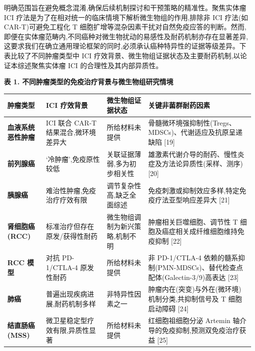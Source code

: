 \documentclass[11pt]{article}
\newcounter{none}
\begin{document}
明确范围旨在避免概念混淆,确保后续机制探讨和干预策略的精准性。聚焦实体瘤 ICI 疗法是为了在相对统一的临床情境下解析微生物组的作用,排除非 ICI 疗法(如 CAR-T)可避免工程化 T 细胞扩增等混杂因素干扰对自然免疫应答的判断。然而,即便在实体瘤范畴内,不同癌种对微生物扰动的易感性及耐药机制亦存在显著差异,这要求我们在确立通用理论框架的同时,必须承认癌种特异性的证据等级差异。下表比较了不同肿瘤类型中 ICI 疗效背景、微生物组证据状态及主要耐药机制,以论证本综述聚焦实体瘤 ICI 的合理性及其内部异质性。

\textbf{表 1. 不同肿瘤类型的免疫治疗背景与微生物组研究情境}

{\def\LTcaptype{none} %
\begin{longtable}[]{@{}
  >{\raggedright\arraybackslash}p{}
  >{\raggedright\arraybackslash}p{}
  >{\raggedright\arraybackslash}p{}
  >{\raggedright\arraybackslash}p{}@{}}
\toprule\noalign{}
\begin{minipage}[b]{\linewidth}\raggedright
肿瘤类型
\end{minipage} & \begin{minipage}[b]{\linewidth}\raggedright
ICI 疗效背景
\end{minipage} & \begin{minipage}[b]{\linewidth}\raggedright
微生物组证据状态
\end{minipage} & \begin{minipage}[b]{\linewidth}\raggedright
关键非菌群耐药因素
\end{minipage} \\
\midrule\noalign{}
\endhead
\bottomrule\noalign{}
\endlastfoot
\textbf{血液系统恶性肿瘤} & ICI 联合 CAR-T 结果混合,微环境差异大 & 所给材料未提供 & 骨髓微环境强抑制性(Tregs、MDSCs)、代谢适应及抗原呈递缺陷 {[}19{]} \\
\textbf{前列腺癌} & `冷肿瘤',免疫原性较低 & 关联证据薄弱,多为初步相关性 & 雄激素代谢介导的耐药、慢性炎症及方法论异质性(采样、测序) {[}20{]} \\
\textbf{胰腺癌} & 难治性肿瘤,免疫治疗疗效有限 & 调节复杂性高,缺乏全面综述 & 免疫刺激或抑制效应多样,特定免疫疗法亚型响应差异大 {[}21{]} \\
\textbf{肾细胞癌(RCC)} & 标准治疗但存在原发/获得性耐药 & 微生物组调制为新兴策略,机制不明 & 肿瘤相关巨噬细胞、调节性 T 细胞及癌症相关成纤维细胞维持免疫抑制 {[}22{]} \\
\textbf{RCC 模型} & 对抗 PD-1/CTLA-4 原发性耐药 & 所给材料未提供 & 非 PD-1/CTLA-4 依赖的髓系抑制(PMN-MDSCs)、替代检查点配体(Galectin-3/9)高表达 {[}23{]} \\
\textbf{肺癌} & 普遍出现疾病进展,耐药机制多样 & 非特异性因素之一 & 肿瘤内在(突变)与外在(微环境)机制分类,共抑制信号及 T 细胞启动障碍 {[}24{]} \\
\textbf{结直肠癌(MSS)} & 微卫星稳定型疗效有限,异质性显著 & 所给材料未提供 & 红细胞祖细胞分泌 Artemin 轴介导的免疫抑制,预测双免疫治疗获益 {[}25{]} \\
\end{longtable}
}
\end{document}
